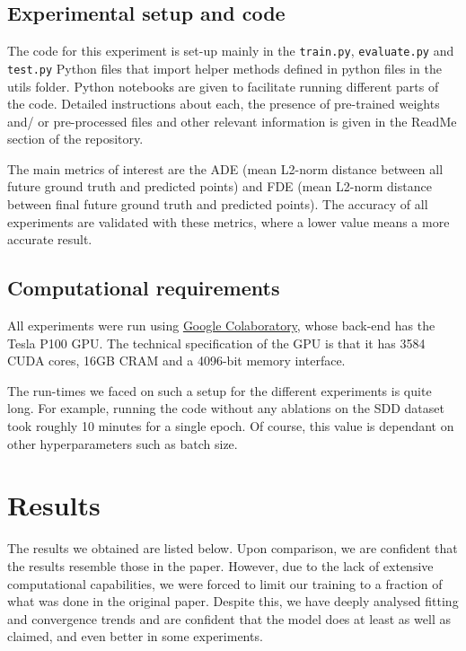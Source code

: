\subsection{Experimental setup and code}

The code for this experiment is set-up mainly in the \texttt{train.py}, \texttt{evaluate.py} and \texttt{test.py} Python files that import helper methods defined in python files in the utils folder. Python notebooks are given to facilitate running different parts of the code. Detailed instructions about each, the presence of pre-trained weights and/ or pre-processed files and other relevant information is given in the ReadMe section of the repository.

The main metrics of interest are the ADE (mean L2-norm distance between all future ground truth and predicted points) and FDE (mean L2-norm distance between final future ground truth and predicted points). The accuracy of all experiments are validated with these metrics, where a lower value means a more accurate result.




\subsection{Computational requirements}

All experiments were run using \href{https://colab.research.google.com/}{Google Colaboratory}, whose back-end has the Tesla P100 GPU. The technical specification of the GPU is that it has 3584 CUDA cores, 16GB CRAM and a 4096-bit memory interface.

The run-times we faced on such a setup for the different experiments is quite long. For example, running the code without any ablations on the SDD dataset took roughly 10 minutes for a single epoch. Of course, this value is dependant on other hyperparameters such as batch size.




\section{Results}
\label{sec:results}


The results we obtained are listed below. Upon comparison, we are confident that the results resemble those in the paper. However, due to the lack of extensive computational capabilities, we were forced to limit our training to a fraction of what was done in the original paper. Despite this, we have deeply analysed fitting and convergence trends and are confident that the model does at least as well as claimed, and even better in some experiments.

